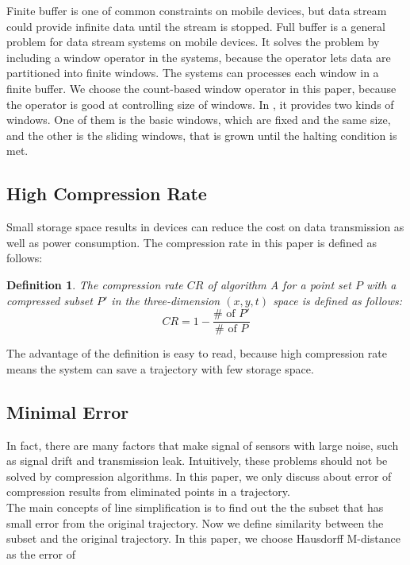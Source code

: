 \documentclass[12pt]{article}
\newtheorem{mydef}{Definition}
\begin{document}
\begin{CJK}{UTF8}{bsmi}
Finite buffer is one of common constraints on mobile devices, but data stream could provide infinite data until the stream is stopped. Full buffer is a general problem for data stream systems on mobile devices. It solves the problem by including a window operator in the systems, because the operator lets data are partitioned into finite windows. The systems can processes each window in a finite buffer. We choose the count-based window operator in this paper, because the operator is good at controlling size of windows. In \cite{2002:VLDB_window}, it provides two kinds of windows. One of them is the basic windows, which are fixed and the same size, and the other is the sliding windows, that is grown until the halting condition is met.\\


\subsection{High Compression Rate}

Small storage space results in devices can reduce the cost on data transmission as well as power consumption. The compression rate in this paper is defined as follows:

\begin{mydef}
The compression rate $CR$ of algorithm A for a point set $P$ with a compressed subset $P'$ in the three-dimension $(x,y,t)$ space is defined as follows:
\[ CR = 1 - \frac{\#\mbox{ of }P'}{\#\mbox{ of }P}\]
\end{mydef}


The advantage of the definition is easy to read, because high compression rate means the system can save a trajectory with few storage space.\\

\subsection{Minimal Error}

In fact, there are many factors that make signal of sensors with large noise, such as signal drift and transmission leak. Intuitively, these problems should not be solved by compression algorithms. In this paper, we only discuss about error of compression results from eliminated points in a trajectory. \\

The main concepts of line simplification is to find out the the subset that has small error from the original trajectory. Now we define similarity between the subset and the original trajectory. In this paper, we choose Hausdorff M-distance as the error of 



\end{CJK}
\end{document}
